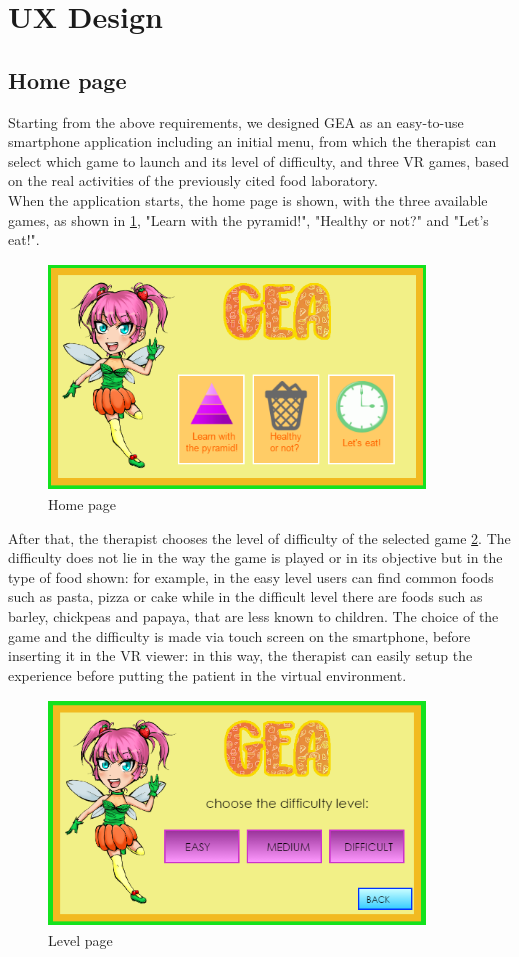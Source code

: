 \section{UX Design}
\subsection{Home page}
Starting from the above requirements, we designed GEA as an easy-to-use smartphone application including an initial menu, from which the therapist can select which game to launch and its level of difficulty, and three VR games, based on the real activities of the previously cited food laboratory.\\
When the application starts, the home page is shown, with the three available games, as shown in \ref{fig:home}, "Learn with the pyramid!", "Healthy or not?" and "Let's eat!". \\
\begin{figure}[H]
\centering
\includegraphics[width=10cm, height=6cm]{immagini/Game.png}
\caption{Home page}\label{fig:home}
\end{figure}
After that, the therapist chooses the level of difficulty of the selected game \ref{fig:level}. The difficulty does not lie in the way the game is played or in its objective but in the type of food shown: for example, in the easy level users can find common foods such as pasta, pizza or cake while in the difficult level there are foods such as barley, chickpeas and papaya, that are less known to children. The choice of the game and the difficulty is made via touch screen on the smartphone, before inserting it in the VR viewer: in this way, the therapist can easily setup the experience before putting the patient in the virtual environment.\\
\begin{figure}[H]
\centering
\includegraphics[width=10cm, height=6cm]{immagini/Level.png}
\caption{Level page}\label{fig:level}
\end{figure}
